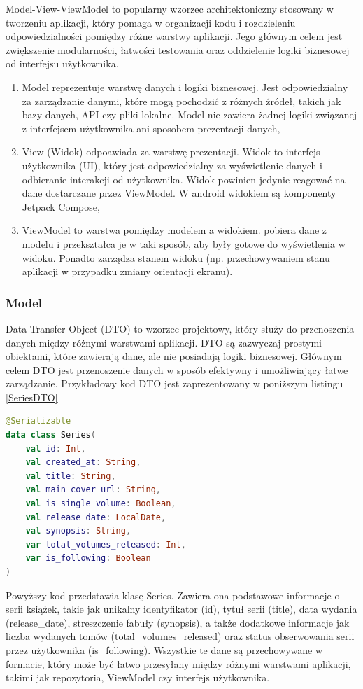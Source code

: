 \documentclass[12pt,twoside]{article}
\begin{document}
Model-View-ViewModel to popularny wzorzec architektoniczny stosowany w tworzeniu aplikacji, który pomaga w 
organizacji kodu i rozdzieleniu odpowiedzialności pomiędzy różne warstwy aplikacji. Jego głównym celem
jest zwiększenie modularności, łatwości testowania oraz oddzielenie logiki biznesowej od interfejsu użytkownika.

\begin{enumerate}[label=\alph*), leftmargin=1.25cm]
	\item Model reprezentuje warstwę danych i logiki biznesowej. Jest odpowiedzialny za zarządzanie danymi,
	które mogą pochodzić z różnych źródeł, takich jak bazy danych, API czy pliki lokalne. Model nie zawiera
	żadnej logiki związanej z interfejsem użytkownika ani sposobem prezentacji danych,
	\item View (Widok) odpoawiada za warstwę prezentacji. Widok to interfejs użytkownika (UI), który jest
	odpowiedzialny za wyświetlenie danych i odbieranie interakcji od użytkownika. Widok powinien jedynie
	reagować na dane dostarczane przez ViewModel. W android widokiem są komponenty Jetpack Compose,
	\item ViewModel to warstwa pomiędzy modelem a widokiem. pobiera dane z modelu i przekształca je
	w taki sposób, aby były gotowe do wyświetlenia w widoku. Ponadto zarządza stanem widoku (np. przechowywaniem
	stanu aplikacji w przypadku zmiany orientacji ekranu).
\end{enumerate}

\subsubsection{Model}

Data Transfer Object (DTO) to wzorzec projektowy, który służy do przenoszenia danych między różnymi warstwami 
aplikacji. DTO są zazwyczaj prostymi obiektami, które zawierają dane, ale nie posiadają logiki biznesowej. Głównym 
celem DTO jest przenoszenie danych w sposób efektywny i umożliwiający łatwe zarządzanie. Przykładowy kod DTO jest 
zaprezentowany w poniższym listingu \ref{SeriesDTO}

\begin{lstlisting}[language=Kotlin,caption=Data Transfer Object Series, label={SeriesDTO}]
@Serializable
data class Series(
    val id: Int,
    val created_at: String,
    val title: String,
    val main_cover_url: String,
    val is_single_volume: Boolean,
    val release_date: LocalDate,
    val synopsis: String,
    var total_volumes_released: Int,
    var is_following: Boolean
)
\end{lstlisting}
Powyższy kod przedstawia klasę Series. Zawiera ona podstawowe informacje o serii książek, takie jak unikalny 
identyfikator (id), tytuł serii (title), data wydania (release\_date), streszczenie fabuły (synopsis), a także 
dodatkowe informacje jak liczba wydanych tomów (total\_volumes\_released) oraz status obserwowania serii przez 
użytkownika (is\_following). Wszystkie te dane są przechowywane w formacie, który może być łatwo przesyłany między 
różnymi warstwami aplikacji, takimi jak repozytoria, ViewModel czy interfejs użytkownika.
\end{document}
